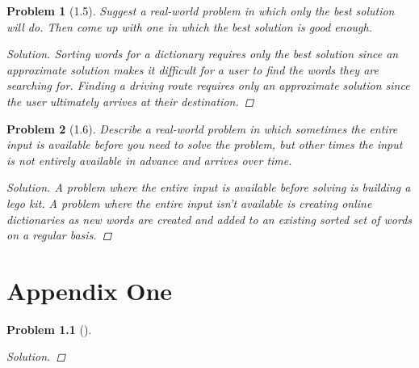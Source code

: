 \documentclass[oneside]{book}
\newtheorem{problem}{Problem}
\begin{document}
\begin{spacing}{1.618}
\begin{problem}[1.5]
		Suggest a real-world problem in which only the best solution will do. Then come up with one in which the best solution is good enough.
	\begin{proof}[Solution]
		Sorting words for a dictionary requires only the best solution since an approximate solution makes it difficult for a user to find the words they are searching for. Finding a driving route requires only an approximate solution since the user ultimately arrives at their destination. 
	\end{proof}
\end{problem}

\begin{problem}[1.6]
	Describe a real-world problem in which sometimes the entire input is available before you need to solve the problem, but other times the input is not entirely available in advance and arrives over time.
	\begin{proof}[Solution]
		A problem where the entire input is available before solving is building a lego kit. A problem where the entire input isn't available is creating online dictionaries as new words are created and added to an existing sorted set of words on a regular basis. 
	\end{proof}
\end{problem}


\appendix
\chapter{Appendix One}

\begin{problem}[]
	\begin{proof}[Solution]

	\end{proof}
\end{problem}

\end{spacing}
\backmatter

\printglossary[type=\acronymtype]
\clearpage

\printglossary
\clearpage

\printbibliography
\clearpage

\printindex
\end{document}
